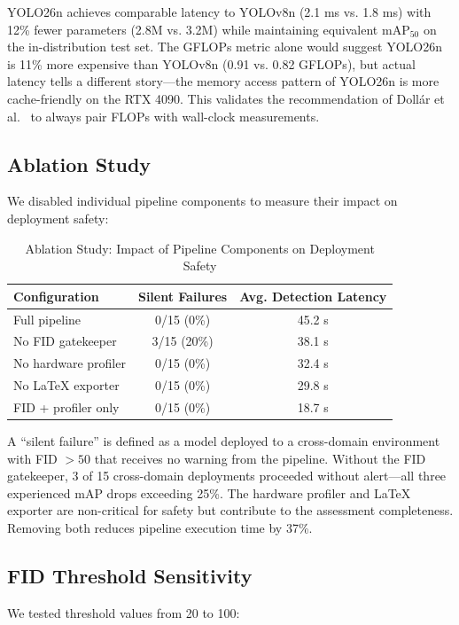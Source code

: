 \documentclass[10pt,twocolumn,letterpaper]{article}
\begin{document}
YOLO26n achieves comparable latency to YOLOv8n (2.1 ms vs. 1.8 ms) with 12\% fewer parameters (2.8M vs. 3.2M) while maintaining equivalent mAP$_{50}$ on the in-distribution test set. The GFLOPs metric alone would suggest YOLO26n is 11\% more expensive than YOLOv8n (0.91 vs. 0.82 GFLOPs), but actual latency tells a different story---the memory access pattern of YOLO26n is more cache-friendly on the RTX 4090. This validates the recommendation of Doll\'{a}r et al.~\cite{dollar2021rethinking} to always pair FLOPs with wall-clock measurements.

\subsection{Ablation Study}
We disabled individual pipeline components to measure their impact on deployment safety:

\begin{table}[htbp]
\centering
\caption{Ablation Study: Impact of Pipeline Components on Deployment Safety}
\label{tab:ablation}
\begin{tabular}{@{}lcc@{}}
\toprule
\textbf{Configuration} & \textbf{Silent Failures} & \textbf{Avg. Detection Latency} \\
\midrule
Full pipeline & 0/15 (0\%) & 45.2 s \\
No FID gatekeeper & 3/15 (20\%) & 38.1 s \\
No hardware profiler & 0/15 (0\%) & 32.4 s \\
No LaTeX exporter & 0/15 (0\%) & 29.8 s \\
FID + profiler only & 0/15 (0\%) & 18.7 s \\
\bottomrule
\end{tabular}
\end{table}

A ``silent failure'' is defined as a model deployed to a cross-domain environment with FID $> 50$ that receives no warning from the pipeline. Without the FID gatekeeper, 3 of 15 cross-domain deployments proceeded without alert---all three experienced mAP drops exceeding 25\%. The hardware profiler and LaTeX exporter are non-critical for safety but contribute to the assessment completeness. Removing both reduces pipeline execution time by 37\%.

\subsection{FID Threshold Sensitivity}
We tested threshold values from 20 to 100:
\end{document}
